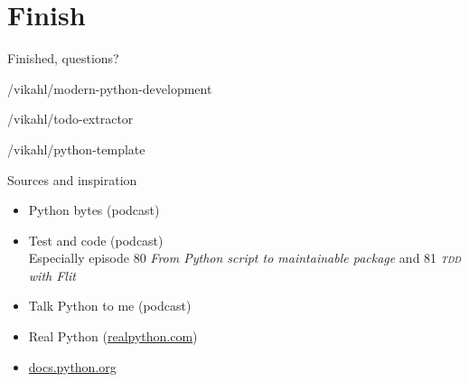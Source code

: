 {%
\section*{Finish}
}

\begin{frame}[standout]
  Finished, questions?

  {\small{}/vikahl/modern-python-development}

  {\small{}/vikahl/todo-extractor}

  {\small{}/vikahl/python-template}
\end{frame}

\begin{frame}
  \titlepage{}
\end{frame}

\begin{frame}{Sources and inspiration}
  \begin{itemize}
    \item Python bytes (podcast)
    \item Test and code (podcast)\\
      {\small Especially episode 80 \emph{From Python script to maintainable package} and 81 \emph{\textsc{tdd} with Flit}}
    \item Talk Python to me (podcast)
    \item Real Python (\url{realpython.com})
    \item \url{docs.python.org}
  \end{itemize}
\end{frame}
